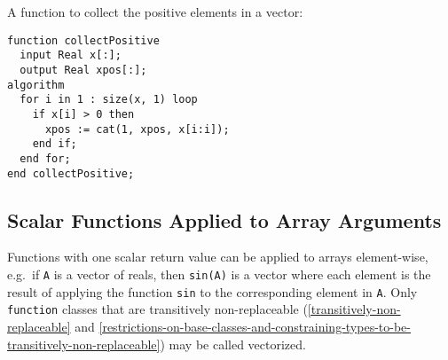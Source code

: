 \begin{example}
A function to collect the positive elements in a vector:
\begin{lstlisting}[language=modelica]
function collectPositive
  input Real x[:];
  output Real xpos[:];
algorithm
  for i in 1 : size(x, 1) loop
    if x[i] > 0 then
      xpos := cat(1, xpos, x[i:i]);
    end if;
  end for;
end collectPositive;
\end{lstlisting}
\end{example}

\subsection{Scalar Functions Applied to Array Arguments}\label{scalar-functions-applied-to-array-arguments}

Functions with one scalar return value can be applied to arrays element-wise, e.g.\ if \lstinline!A! is a vector of reals, then \lstinline!sin(A)! is a vector where each element is the result of applying the function \lstinline!sin! to the corresponding element in \lstinline!A!.  Only \lstinline!function! classes that are transitively non-replaceable (\cref{transitively-non-replaceable} and \cref{restrictions-on-base-classes-and-constraining-types-to-be-transitively-non-replaceable}) may be called vectorized.

